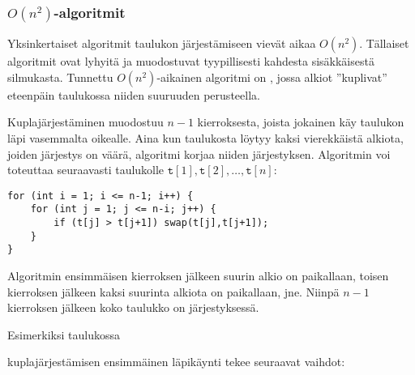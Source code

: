 \subsubsection{$O(n^2)$-algoritmit}


Yksinkertaiset algoritmit taulukon
järjestämiseen vievät aikaa $O(n^2)$.
Tällaiset algoritmit ovat lyhyitä ja
muodostuvat tyypillisesti
kahdesta sisäkkäisestä silmukasta.
Tunnettu $O(n^2)$-aikainen algoritmi on
,
jossa alkiot ''kuplivat'' eteenpäin taulukossa
niiden suuruuden perusteella.

Kuplajärjestäminen muodostuu $n-1$ kierroksesta,
joista jokainen käy taulukon läpi vasemmalta oikealle.
Aina kun taulukosta löytyy kaksi vierekkäistä
alkiota, joiden järjestys on väärä, algoritmi
korjaa niiden järjestyksen.
Algoritmin voi toteuttaa seuraavasti
taulukolle
$\texttt{t}[1],\texttt{t}[2],\ldots,\texttt{t}[n]$:
\begin{lstlisting}
for (int i = 1; i <= n-1; i++) {
    for (int j = 1; j <= n-i; j++) {
        if (t[j] > t[j+1]) swap(t[j],t[j+1]);
    }
}
\end{lstlisting}

Algoritmin ensimmäisen kierroksen jälkeen suurin
alkio on paikallaan, toisen kierroksen jälkeen
kaksi suurinta alkiota on paikallaan, jne.
Niinpä $n-1$ kierroksen jälkeen koko taulukko
on järjestyksessä.

Esimerkiksi taulukossa

\begin{center}
\end{center}

\noindent
kuplajärjestämisen ensimmäinen
läpikäynti tekee seuraavat vaihdot:

